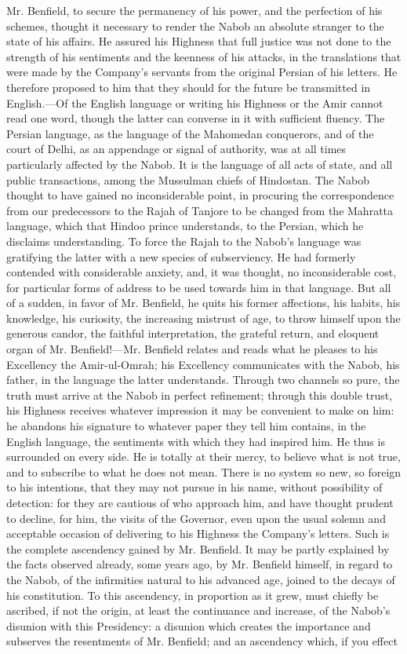 Mr. Benfield, to secure the permanency of his power, and the perfection of his schemes, thought it necessary to render the Nabob an absolute stranger to the state of his affairs. He assured his Highness that full justice was not done to the strength of his sentiments and the keenness of his attacks, in the translations that were made by the Company's servants from the original Persian of his letters. He therefore proposed to him that they should for the future be transmitted in English.—Of the English language or writing his Highness or the Amir cannot read one word, though the latter can converse in it with sufficient fluency. The Persian language, as the language of the Mahomedan conquerors, and of the court of Delhi, as an appendage or signal of authority, was at all times particularly affected by the Nabob. It is the language of all acts of state, and all public transactions, among the Mussulman chiefs of Hindostan. The Nabob thought to have gained no inconsiderable point, in procuring the correspondence from our predecessors to the Rajah of Tanjore to be changed from the Mahratta language, which that Hindoo prince understands, to the Persian, which he disclaims understanding. To force the Rajah to the Nabob's language was gratifying the latter with a new species of subserviency. He had formerly contended with considerable anxiety, and, it was thought, no inconsiderable cost, for particular forms of address to be used towards him in that language. But all of a sudden, in favor of Mr. Benfield, he quits his former affections, his habits, his knowledge, his curiosity, the increasing mistrust of age, to throw himself upon the generous candor, the faithful interpretation, the grateful return, and eloquent organ of Mr. Benfield!—Mr. Benfield relates and reads what he pleases to his Excellency the Amir-ul-Omrah; his Excellency communicates with the Nabob, his father, in the language the latter understands. Through two channels so pure, the truth must arrive at the Nabob in perfect refinement; through this double trust, his Highness receives whatever impression it may be convenient to make on him: he abandons his signature to whatever paper they tell him contains, in the English language, the sentiments with which they had inspired him. He thus is surrounded on every side. He is totally at their mercy, to believe what is not true, and to subscribe to what he does not mean. There is no system so new, so foreign to his intentions, that they may not pursue in his name, without possibility of detection: for they are cautious of who approach him, and have thought prudent to decline, for him, the visits of the Governor, even upon the usual solemn and acceptable occasion of delivering to his Highness the Company's letters. Such is the complete ascendency gained by Mr. Benfield. It may be partly explained by the facts observed already, some years ago, by Mr. Benfield himself, in regard to the Nabob, of the infirmities natural to his advanced age, joined to the decays of his constitution. To this ascendency, in proportion as it grew, must chiefly be ascribed, if not the origin, at least the continuance and increase, of the Nabob's disunion with this Presidency: a disunion which creates the importance and subserves the resentments of Mr. Benfield; and an ascendency which, if you effect 